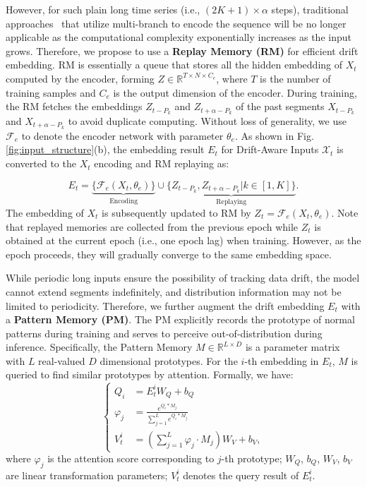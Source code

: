 \documentclass[sigconf]{acmart}
\begin{document}
However, for such plain long time series (i.e., $(2K+1)\times\alpha$ steps), traditional approaches~\cite{zhang2017deep,guo2019attention,jiang2021deepcrowd} that utilize multi-branch to encode the sequence will be no longer applicable as the computational complexity exponentially increases as the input grows. Therefore, we propose to use a \textbf{Replay Memory (RM)} for efficient drift embedding. RM is essentially a queue that stores all the hidden embedding of $\mathit{X}_t$ computed by the encoder, forming $\mathit{Z}\in\mathbb{R}^{T\times N\times C_e}$, where $T$ is the number of training samples and $C_e$ is the output dimension of the encoder. During training, the RM fetches the embeddings $\mathit{Z}_{t-P_k}$ and $\mathit{Z}_{t+\alpha-P_k}$ of the past segments $\mathit{X}_{t-P_k}$ and $\mathit{X}_{t+\alpha-P_k}$ to avoid duplicate computing. Without loss of generality, we use $\mathcal{F}_e$ to denote the encoder network with parameter $\theta_e$. As shown in Fig. \ref{fig:input_structure}(b), the embedding result $\mathit{E}_t$ for Drift-Aware Inputs $\mathcal{X}_t$ is converted to the $\mathit{X}_t$ encoding and RM replaying as:

\begin{equation}
    \mathit{E}_t = \underbrace{\{\mathcal{F}_e(\mathit{X}_t, \theta_e)\}}_{\text{Encoding}} \cup \underbrace{\{\mathit{Z}_{t-P_k}, \mathit{Z}_{t+\alpha-P_k}|k\in[1,K]\}}_{\text{Replaying}}.
\label{eq:et}
\end{equation}
The embedding of $\mathit{X}_t$ is subsequently updated to RM by $\mathit{Z}_t = \mathcal{F}_e(\mathit{X}_t, \theta_e)$. Note that replayed memories are collected from the previous epoch while $\mathit{Z}_t$ is obtained at the current epoch (i.e., one epoch lag) when training. However, as the epoch proceeds, they will gradually converge to the same embedding space.

While periodic long inputs ensure the possibility of tracking data drift, the model cannot extend segments indefinitely, and distribution information may not be limited to periodicity. Therefore, we further augment the drift embedding $E_t$ with a \textbf{Pattern Memory (PM)}. The PM explicitly records the prototype of normal patterns during training and serves to perceive out-of-distribution during inference. Specifically, the Pattern Memory $M\in \mathbb{R}^{L\times D}$ is a parameter matrix with $L$ real-valued $D$ dimensional prototypes. For the $i$-th embedding in $\mathit{E}_t$, $M$ is queried to find similar prototypes by attention. Formally, we have:
\begin{equation}
\left\{
\begin{aligned}
    Q_i &= E_t^i\mathit{W}_Q+b_Q \\
    \varphi_j &= \frac{e^{Q_i\ast M_j}}{\sum_{j=1}^{L}e^{Q_i\ast M_j}} \\
    \mathit{V}_t^i &= (\sum_{j=1}^{L}\varphi_j\cdot M_j)\mathit{W}_V+b_V,
\label{eq:att}
\end{aligned}
\right.
\end{equation}
where $\varphi_j$ is the attention score corresponding to $j$-th prototype; $\mathit{W_Q}$, $b_Q$, $\mathit{W_V}$, $b_V$ are linear transformation parameters; $\mathit{V}_t^i$ denotes the query result of $\mathit{E}_t^i$.
\end{document}
